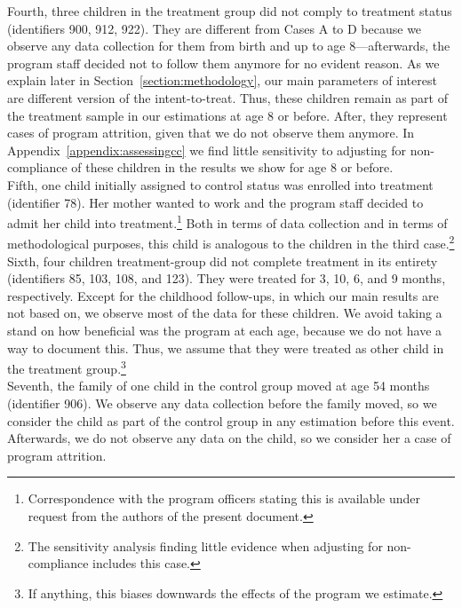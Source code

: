 \noindent Fourth, three children in the treatment group did not comply to treatment status (identifiers 900, 912, 922). They are different from Cases A to D because we observe any data collection for them from birth and up to age 8---afterwards, the program staff decided not to follow them anymore for no evident reason. As we explain later in Section~\ref{section:methodology}, our main parameters  of interest are different version of the intent-to-treat. Thus, these children remain as part of the treatment sample in our estimations at age 8 or before. After, they represent cases of program attrition, given that we do not observe them anymore. In Appendix~\ref{appendix:assessingcc} we find little sensitivity to adjusting for non-compliance of these children in the results we show for age 8 or before.\\



\noindent Fifth, one child initially assigned to control status was enrolled into treatment (identifier 78). Her mother wanted to work and the program staff decided to admit her child into treatment.\footnote{Correspondence with the program officers stating this is available under request from the authors of the present document.} Both in terms of data collection and in terms of methodological purposes, this child is analogous to the children in the third case.\footnote{The sensitivity analysis finding little evidence when adjusting for non-compliance includes this case.}\\

\noindent Sixth, four children treatment-group did not complete treatment in its entirety (identifiers 85, 103, 108, and 123). They were treated for 3, 10, 6, and 9 months, respectively. Except for the childhood follow-ups, in which our main results are not based on, we observe most of the data for these children. We avoid taking a stand on how beneficial was the program at each age, because we do not have a way to document this. Thus, we assume that they were treated as other child in the treatment group.\footnote{If anything, this biases downwards the effects of the program we estimate.} \\

\noindent Seventh, the family of one child in the control group moved at age 54 months (identifier 906). We observe any data collection before the family moved, so we consider the child as part of the control group in any estimation before this event. Afterwards, we do not observe any data on the child, so we consider her a case of program attrition.\\

